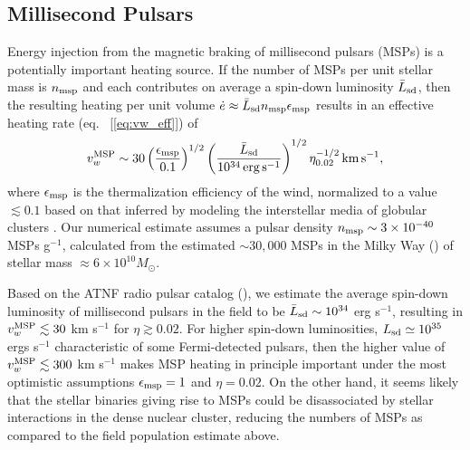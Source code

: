 \documentclass[usenatbib,fleqn]{mn2e}
\begin{document}



\subsection{Millisecond Pulsars}
 Energy injection from the magnetic braking of millisecond pulsars (MSPs) is a potentially
important heating source.  If the number of MSPs per unit stellar mass
is $n_{\rm msp}$ and each contributes on average a spin-down
luminosity $\bar{L}_{\rm sd}$, then the resulting heating per unit
volume $\dot{e} \approx \bar{L}_{\rm sd}n_{\rm msp}\epsilon_{\rm msp}$ results in an
effective heating rate (eq.~ [\ref{eq:vw_eff}]) of 
\begin{eqnarray} v_{w}^{\rm MSP} \sim
30\left(\frac{\epsilon_{\rm msp}}{0.1}\right)^{1/2}\left(\frac{\bar{L}_{\rm
sd}}{10^{34}\,{\rm erg\,s^{-1}}}\right)^{1/2} \eta_{0.02}^{-1/2}\,{\rm
km\,s^{-1}},
 \label{eq:vmsp}
  \end{eqnarray} 
where $\epsilon_{\rm msp}$ is the thermalization efficiency of
the wind, normalized to a value $\lesssim 0.1$ based on that inferred by modeling the interstellar media of globular clusters
\citep{NaimanSoares-Furtado+:2013a}.  Our numerical estimate assumes a
pulsar density $n_{\rm msp} \sim 3 \times 10^{-40} $ MSPs g$^{-1}$, calculated from the estimated $\sim 30,000$ MSPs in the Milky Way (\citealt{Lorimer13}) of stellar mass $\approx 6\times 10^{10}M_{\odot}$.

Based on the ATNF radio pulsar catalog (\citealt{Manchester+05}), we estimate the average spin-down luminosity of millisecond pulsars in the field to be $\bar{L}_{\rm sd} \sim 10^{34}$ erg s$^{-1}$, resulting in $v_{w}^{\rm MSP} \lesssim 30$ km s$^{-1}$ for $\eta \gtrsim 0.02$.  For higher spin-down
luminosities, $L_{\rm sd}\simeq 10^{35}$ ergs s$^{-1}$ characteristic
of some Fermi-detected pulsars, then the higher value of $v_{w}^{\rm MSP}
\lesssim 300$ km s$^{-1}$ makes MSP heating in principle important
under the most optimistic assumptions $\epsilon_{\rm msp} = 1$ and $\eta = 0.02$.  On the other hand, it seems likely that the stellar binaries giving rise to MSPs could be disassociated by stellar interactions in the dense nuclear cluster, reducing the numbers of MSPs as compared to the field population estimate above.  
\end{document}

